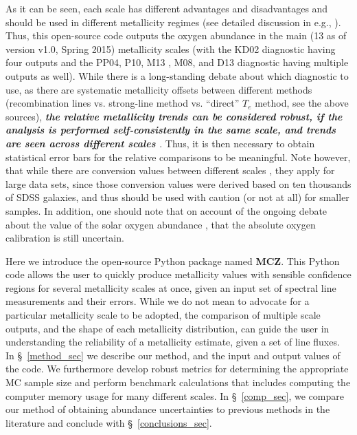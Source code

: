 \documentclass{emulateapj}
\begin{document}
As it can be seen, each scale has different advantages and disadvantages and should be used in different metallicity regimes (see detailed discussion in e.g.,  \citealt{kewley02,stasinska02,kewley08,moustakas10,lopezsanchez12,dopita13,blanc15}). Thus, this open-source code outputs the oxygen abundance in the main (13 as of version v1.0, Spring 2015) metallicity scales (with the KD02 diagnostic having four outputs and the PP04, P10, M13 , M08, and D13  diagnostic having multiple outputs as well). While there is a long-standing debate about which diagnostic to use, as there are systematic metallicity offsets between different methods (recombination lines vs. strong-line method vs. ``direct'' $T_e$ method, see the above sources), \emph{\bf the relative metallicity trends can be considered robust, if the analysis is performed self-consistently in the same scale, and trends are seen across different scales \citep{kewley08,moustakas10}}. Thus, it is then necessary to obtain statistical error bars for the relative comparisons to be meaningful. Note however, that while there are conversion values between different scales \citep{kewley08}, they apply for large data sets, since those conversion values were derived based on ten thousands of SDSS galaxies, and thus should be used with caution (or not at all) for smaller samples.
In addition, one should note that on account of the ongoing debate about the value of the solar oxygen abundance \citep{asplund09_rev,chaffau11}, that the absolute oxygen calibration is still uncertain.



Here we introduce the open-source Python package named \textbf{MCZ}.
This Python code allows the user to quickly produce metallicity values with sensible confidence regions for several metallicity scales at once, given an input set of spectral line measurements and their errors. While we do not mean to advocate for a particular metallicity scale to be adopted, the comparison of multiple scale outputs, and the shape of each metallicity distribution, can guide the user in understanding the reliability of a metallicity estimate, given a set of line fluxes. In \S~\ref{method_sec} we describe our method, and the input and output values of the code. We furthermore develop robust metrics for determining the appropriate MC sample size and perform benchmark calculations that includes computing the computer memory usage for many different scales. In \S~\ref{comp_sec}, we compare our method of obtaining abundance uncertainties to previous methods in the literature and conclude with \S~\ref{conclusions_sec}. 
\end{document}
